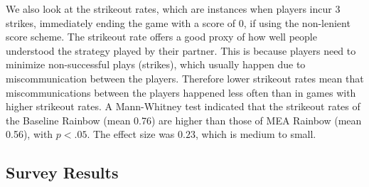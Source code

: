 \documentclass[letterpaper]{article} %
\begin{document}
We also look at the strikeout rates, which are instances when players incur 3 strikes, immediately ending the game with a score of 0, if using the non-lenient score scheme. The strikeout rate offers a good proxy of how well people understood the strategy played by their  partner. This is because players need to minimize non-successful plays (strikes), which usually happen due to miscommunication between the players. Therefore lower strikeout rates mean that miscommunications between the players happened less often than in games with higher strikeout rates. 
A Mann-Whitney test indicated that the strikeout rates of the Baseline Rainbow (mean 0.76) are higher than those of MEA Rainbow (mean 0.56), with $p < .05$. The effect size was $0.23$, which is medium to small.



\subsection{Survey Results}
\end{document}
